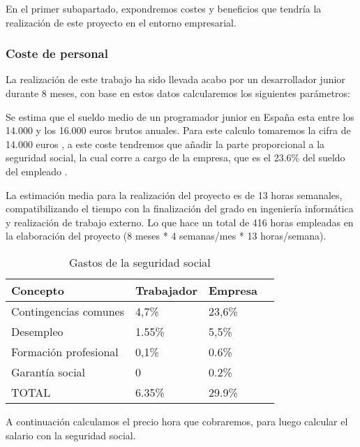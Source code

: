 En el primer subapartado, expondremos costes y beneficios que tendría la realización de este proyecto en el entorno empresarial.

\subsubsection{Coste de personal}

La realización de este trabajo ha sido llevada acabo por un desarrollador junior durante 8 meses, con base en estos datos calcularemos los siguientes parámetros:

Se estima que el sueldo medio de un programador junior en España esta entre los 14.000 y los 16.000 euros brutos anuales. Para este calculo tomaremos la cifra de 14.000 euros , a este coste tendremos que añadir la parte proporcional a la seguridad social, la cual corre a cargo de la empresa, que es el 23.6\% del sueldo del empleado \cite{seguirdadSocial}. 

La estimación media para la realización del proyecto es de 13 horas semanales, compatibilizando el tiempo con la finalización del grado en ingeniería informática y realización de trabajo externo. Lo que hace un total de 416 horas empleadas en la elaboración del proyecto (8 meses * 4 semanas/mes * 13 horas/semana).


\begin{table}[h]
	\begin{center}
		\begin{tabular}{llll}
			Concepto              & Trabajador & Empresa &  \\ \hline
			Contingencias comunes & 4,7\%      & 23,6\%  &  \\ \hline
			Desempleo             & 1.55\%     & 5,5\%   &  \\ \hline
			Formación profesional & 0,1\%      & 0.6\%   &  \\ \hline 
			Garantía social       & 0          & 0.2\%   &  \\ \hline     
			TOTAL                 & 6.35\%     & 29.9\% &   \\
		\end{tabular}
	\caption{Gastos de la seguridad social}
	\label{tabla:tabla2}
	\end{center}
\end{table}

A continuación calculamos el precio hora que cobraremos, para luego calcular el salario con la seguridad social.

